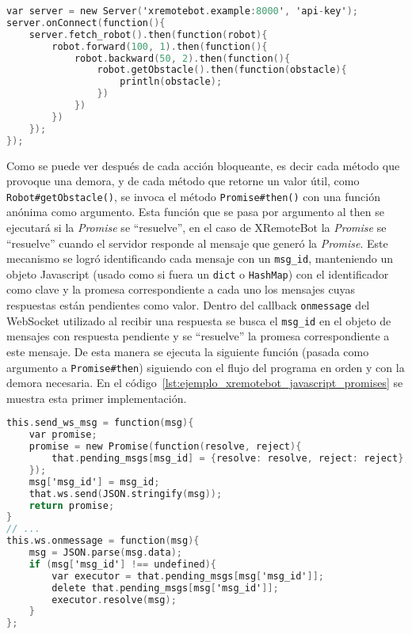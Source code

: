 \begin{lstlisting}[language=C,
caption={Ejemplo de XRemoteBot en Javascript},
label=lst:ejemplo_xremotebot_javascript]
var server = new Server('xremotebot.example:8000', 'api-key');
server.onConnect(function(){
    server.fetch_robot().then(function(robot){
        robot.forward(100, 1).then(function(){
            robot.backward(50, 2).then(function(){
                robot.getObstacle().then(function(obstacle){
                    println(obstacle);
                })
            })
        })
    });
});
\end{lstlisting}

Como se puede ver después de cada acción bloqueante, es decir cada método que
provoque una demora, y de cada método que retorne un valor útil, como
\texttt{Robot\#getObstacle()}, se invoca el método \texttt{Promise\#then()} con
una función anónima como argumento. Esta función que se pasa por argumento al
then se ejecutará si la \textit{Promise} se ``resuelve'', en el caso de
XRemoteBot la \textit{Promise} se ``resuelve'' cuando el servidor
responde al mensaje que generó la \textit{Promise}.
Este mecanismo se logró identificando cada mensaje con un \texttt{msg\_id},
manteniendo un objeto Javascript (usado como si fuera un \texttt{dict}
o \texttt{HashMap}) con el identificador como clave y la promesa
correspondiente a cada uno los mensajes cuyas respuestas están pendientes
como valor. Dentro del callback \texttt{onmessage} del WebSocket utilizado
al recibir una respuesta se busca el \texttt{msg\_id} en el objeto de
mensajes con respuesta pendiente y se ``resuelve'' la promesa correspondiente
a este mensaje. De esta manera se ejecuta la siguiente función (pasada como
argumento a \texttt{Promise\#then}) siguiendo con el flujo del programa
en orden y con la demora necesaria. En el
código~\ref{lst:ejemplo_xremotebot_javascript_promises} se muestra esta primer
implementación.


\begin{lstlisting}[language=C,
caption={Ejemplo simplificado de la implementación de XRemoteBot con
Promises dentro del constructor Server en remotebot.js},
label=lst:ejemplo_xremotebot_javascript_promises]
this.send_ws_msg = function(msg){
    var promise;
    promise = new Promise(function(resolve, reject){
        that.pending_msgs[msg_id] = {resolve: resolve, reject: reject};
    });
    msg['msg_id'] = msg_id;
    that.ws.send(JSON.stringify(msg));
    return promise;
}
// ...
this.ws.onmessage = function(msg){
    msg = JSON.parse(msg.data);
    if (msg['msg_id'] !== undefined){
        var executor = that.pending_msgs[msg['msg_id']];
        delete that.pending_msgs[msg['msg_id']];
        executor.resolve(msg);
    }
};
\end{lstlisting}


